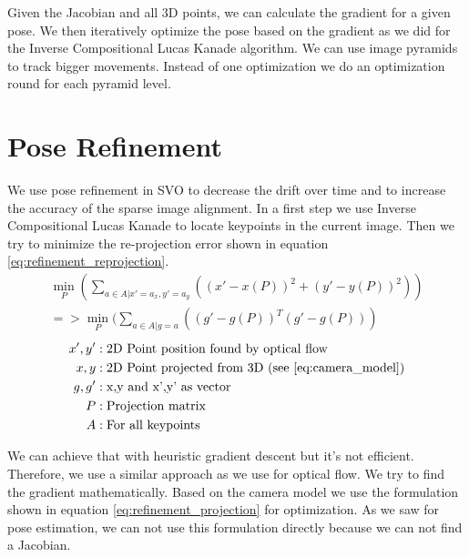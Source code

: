 \documentclass[11pt,a4paper,titlepage,oneside]{report}
\begin{document}
Given the Jacobian and all 3D points, we can calculate the gradient for a given pose. We then iteratively optimize the pose based on the gradient as we did for the Inverse Compositional Lucas Kanade algorithm. We can use image pyramids to track bigger movements. Instead of one optimization we do an optimization round for each pyramid level.

\chapter{Pose Refinement}\label{ch:pose_refinement}

We use pose refinement in SVO to decrease the drift over time and to increase the accuracy of the sparse image alignment. In a first step we use Inverse Compositional Lucas Kanade to locate keypoints in the current image. Then we try to minimize the re-projection error shown in equation \ref{eq:refinement_reprojection}.
\begin{equation}\label{eq:refinement_reprojection}
  \begin{gathered}
    \min_P(\sum_{a \in A|x'=a_x,y'=a_y}((x'-x(P))^2+(y'-y(P))^2))\\
    =>\min_P(\sum_{a \in A|g=a}((g'-g(P))^T(g'-g(P)))
  \end{gathered}
\end{equation}
\begin{align*}
  x',y'   &: \text{2D Point position found by optical flow}\\
  x,y     &: \text{2D Point projected from 3D (see \ref{eq:camera_model})}\\
  g,g'    &: \text{x,y and x',y' as vector}\\
  P       &: \text{Projection matrix}\\
  A       &: \text{For all keypoints}\\
\end{align*}

We can achieve that with heuristic gradient descent but it's not efficient. Therefore, we use a similar approach as we use for optical flow. We try to find the gradient mathematically. Based on the camera model we use the formulation shown in equation \ref{eq:refinement_projection} for optimization. As we saw for pose estimation, we can not use this formulation directly because we can not find a Jacobian.
\end{document}
